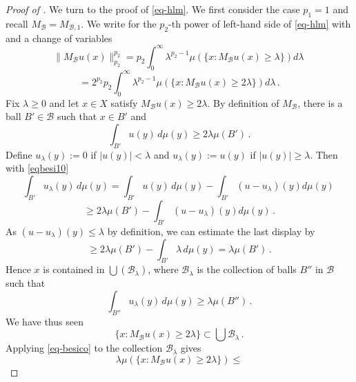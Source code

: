 \documentclass[10pt,a4paper]{article}
\theoremstyle{plain}
\theoremstyle{definition}
\numberwithin{equation}{subsection}
\begin{document}
\begin{proof}[Proof of ]
We turn to the proof of \eqref{eq-hlm}. We first consider the case $p_1=1$ and recall $M_{\mathcal{B}}=M_{\mathcal{B},1}$.
We write for the $p_2$-th power of left-hand side of \eqref{eq-hlm}
with 
and a change of variables
\begin{equation}
    \|M_{\mathcal{B}}u(x)\|_{p_2}^{p_2}
   =p_2\int _0^{\infty}
    \lambda^{p_2-1} \mu(\{x: M_{\mathcal{B}}u(x)\ge \lambda\}) d\lambda\,
\end{equation}
\begin{equation} \label{eqbesi11}
   =2^{p_2} p_2\int _0^{\infty}
    \lambda^{p_2-1} \mu(\{x: M_{\mathcal{B}}u(x)\ge 2\lambda\}) d\lambda\, .
\end{equation}
Fix $\lambda\ge 0$ and let $x\in X$ satisfy $M_{\mathcal{B}}u(x)\ge 2\lambda$. By definition of $M_{\mathcal{B}}$, there is a ball
$B'\in \mathcal{B}$ such that
$x\in B'$ and
\begin{equation}\label{eqbesi10}
\int_{B'} u(y)\, d\mu(y)\ge 2\lambda \mu({B'}) \, .
\end{equation}
Define
$u_\lambda(y):=0$ if $|u(y)|<\lambda$ and $u_\lambda(y):=u(y)$ if $|u(y)|\ge \lambda$.
Then with \eqref{eqbesi10}
\begin{equation}
\int_{B'} u_\lambda (y)\, d\mu(y)
=\int_{B'} u (y)\, d\mu(y)-
\int_{B'} (u-u_\lambda) (y) d\mu(y)\,
\end{equation}
\begin{equation}
\ge 2\lambda \mu({B'})-
\int_{B'} (u-u_\lambda) (y) d\mu(y)\, .
\end{equation}
As $(u-u_\lambda)(y)\le \lambda$
by definition, we can estimate the last display by
\begin{equation}
\ge 2\lambda \mu({B'})-
\int_{B'} \lambda \, d\mu(y)
=\lambda \mu({B'})\, .
\end{equation}
Hence $x$ is contained in
$\bigcup(\mathcal{B}_\lambda)$,
where $\mathcal{B}_\lambda$
is the collection of balls $B''$ in $\mathcal{B}$ such that
\begin{equation}
    \int_{B''} u_\lambda (y)\, d\mu(y)\ge \lambda \mu(B'')\, .
\end{equation}
We have thus seen
\begin{equation}
    \{x: M_{\mathcal{B}}u(x)\ge 2\lambda\}\subset
    \bigcup \mathcal{B}_\lambda
\, .
\end{equation}
Applying \eqref{eq-besico} to the collection $\mathcal{B}_\lambda$
gives
\begin{equation}
    \lambda \mu(\{x: M_{\mathcal{B}}u(x)\ge 2\lambda\})\le

\end{equation}
\end{proof}
\end{document}
